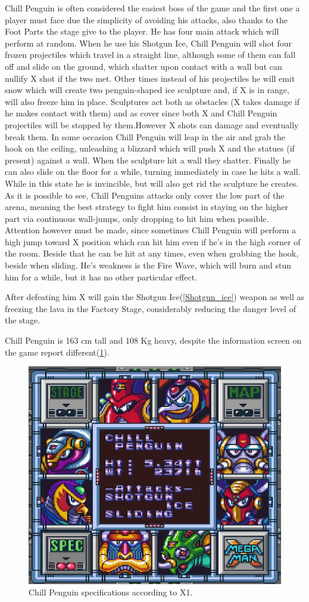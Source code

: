 Chill Penguin is often considered the easiest boss of the game and the first one a player must face due the simplicity of avoiding his attacks, also thanks to the Foot Parts the stage give to the player. He has four main attack which will perform at random\cite{wiki:Chill_Penguin}. When he use his Shotgun Ice, Chill Penguin will shot four frozen projectiles which travel in a straight line, although some of them  can fall off and slide on the ground, which shatter upon contact with a wall but can nullify X shot if the two met. Other times instead of his projectiles he will emit snow which will create two penguin-shaped ice sculpture and, if X is in range, will also freeze him in place. Sculptures act both as obstacles (X takes damage if he makes contact with them) and as cover since both X and Chill Penguin projectiles will be stopped by them.However X shots can damage and eventually break them. In some occasion Chill Penguin will leap in the air and grab the hook on the ceiling, unleashing a blizzard which will push X and the statues (if present) against a wall. When the sculpture hit a wall they shatter. Finally he can also slide on the floor for a while, turning immediately in case he hits a wall. While in this state he is invincible, but will also get rid the sculpture he creates.  As it is possible to see, Chill Penguins attacks only cover the low part of the arena, meaning the best strategy to fight him consist in staying on the higher part via continuous wall-jumps, only dropping to hit him when possible. Attention however must be made, since sometimes Chill Penguin will perform a high jump toward X position which can hit him even if he's  in the high corner of the room. Beside that he can be hit at any times, even when grabbing the hook, beside when sliding. He's weakness is the Fire Wave, which will burn and stun him for a while, but it has no other particular effect.


After defeating him X will gain the Shotgun Ice(\ref{Shotgun_ice}) weapon as well as freezing the lava in the Factory Stage, considerably reducing the danger level of the stage.

Chill Penguin is 163 cm tall and 108 Kg heavy, despite the information screen on the game report different(\ref{Penguin_specs}).

\begin{figure}[h]
	\centering
	\includegraphics[width=0.5\linewidth]{figures/X1/Chill_penguin_specs.jpg}
	\caption{Chill Penguin specifications according to X1.}
	\label{Penguin_specs}
\end{figure}


